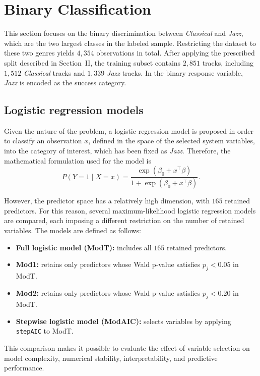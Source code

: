 \section{Binary Classification}
This section focuses on the binary discrimination between \textit{Classical} and \textit{Jazz}, which are the two largest classes in the labeled sample. Restricting the dataset to these two genres yields \(4{,}354\) observations in total. After applying the prescribed split described in Section~II, the training subset contains \(2{,}851\) tracks, including \(1{,}512\) \textit{Classical} tracks and \(1{,}339\) \textit{Jazz} tracks. In the binary response variable, \textit{Jazz} is encoded as the success category.
\subsection{Logistic regression models}
Given the nature of the problem, a logistic regression model is proposed in order to classify an observation \(x\), defined in the space of the selected system variables, into the category of interest, which has been fixed as \textit{Jazz}. Therefore, the mathematical formulation used for the model is
\begin{equation}
P(Y = 1 \mid X = x) =
\frac{\exp\left(\beta_0 + x^\top \beta\right)}
{1 + \exp\left(\beta_0 + x^\top \beta\right)}.
\label{eq:logistic_model_binary}
\end{equation}

However, the predictor space has a relatively high dimension, with \(165\) retained predictors. For this reason, several maximum-likelihood logistic regression models are compared, each imposing a different restriction on the number of retained variables. The models are defined as follows:
\begin{itemize}
    \item \textbf{Full logistic model (ModT):} includes all \(165\) retained predictors.
    \item \textbf{Mod1:} retains only predictors whose Wald p-value satisfies \(p_j < 0.05\) in ModT.
    \item \textbf{Mod2:} retains only predictors whose Wald p-value satisfies \(p_j < 0.20\) in ModT.
    \item \textbf{Stepwise logistic model (ModAIC):} selects variables by applying \texttt{stepAIC} to ModT.
\end{itemize}

This comparison makes it possible to evaluate the effect of variable selection on model complexity, numerical stability, interpretability, and predictive performance.

